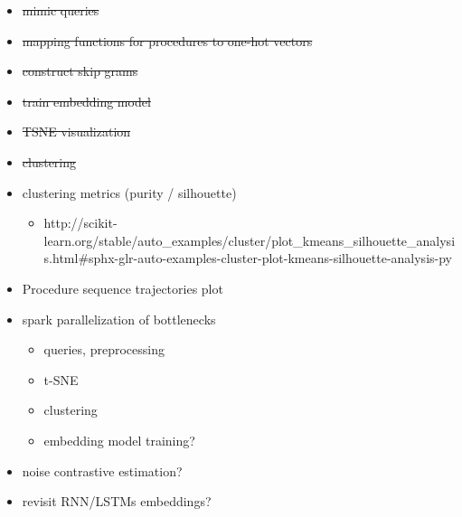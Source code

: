 \documentclass[11pt]{article}
\providecommand{\tightlist}{%
      \setlength{\itemsep}{0pt}\setlength{\parskip}{0pt}}
\begin{document}
\begin{itemize}
\tightlist
\item
  \sout{mimic queries}
\item
  \sout{mapping functions for procedures to one-hot vectors}
\item
  \sout{construct skip grams}
\item
  \sout{train embedding model}
\item
  \sout{TSNE visualization}
\item
  \sout{clustering}
\item
  clustering metrics (purity / silhouette)

  \begin{itemize}
  \tightlist
  \item
    http://scikit-learn.org/stable/auto\_examples/cluster/plot\_kmeans\_silhouette\_analysis.html\#sphx-glr-auto-examples-cluster-plot-kmeans-silhouette-analysis-py
  \end{itemize}
\item
  Procedure sequence trajectories plot
\item
  spark parallelization of bottlenecks

  \begin{itemize}
  \tightlist
  \item
    queries, preprocessing
  \item
    t-SNE
  \item
    clustering
  \item
    embedding model training?
  \end{itemize}
\item
  noise contrastive estimation?
\item
  revisit RNN/LSTMs embeddings?
\end{itemize}
\end{document}

